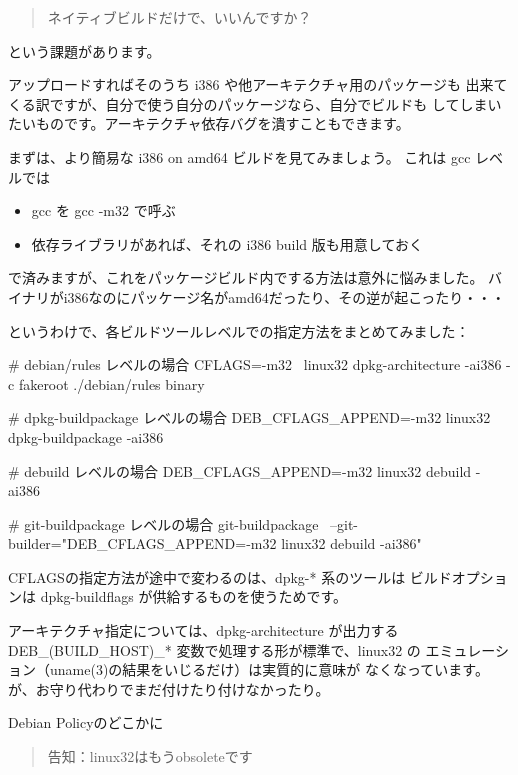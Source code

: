 \documentclass[mingoth,a4paper]{jsarticle}
\begin{document}
\begin{quote}
\Large{ネイティブビルドだけで、いいんですか？}
\end{quote}

という課題があります。

アップロードすればそのうち i386 や他アーキテクチャ用のパッケージも
出来てくる訳ですが、自分で使う自分のパッケージなら、自分でビルドも
してしまいたいものです。アーキテクチャ依存バグを潰すこともできます。

まずは、より簡易な i386 on amd64 ビルドを見てみましょう。
これは gcc レベルでは

\begin{itemize}
\item gcc を gcc -m32 で呼ぶ
\item 依存ライブラリがあれば、それの i386 build 版も用意しておく
\end{itemize}

で済みますが、これをパッケージビルド内でする方法は意外に悩みました。
バイナリがi386なのにパッケージ名がamd64だったり、その逆が起こったり・・・

というわけで、各ビルドツールレベルでの指定方法をまとめてみました：

\begin{commandline}
# debian/rules レベルの場合
CFLAGS=-m32 \
linux32 dpkg-architecture -ai386 -c fakeroot ./debian/rules binary

# dpkg-buildpackage レベルの場合
DEB_CFLAGS_APPEND=-m32 linux32 dpkg-buildpackage -ai386

# debuild レベルの場合
DEB_CFLAGS_APPEND=-m32 linux32 debuild -ai386

# git-buildpackage レベルの場合
git-buildpackage \
--git-builder="DEB_CFLAGS_APPEND=-m32 linux32 debuild -ai386"
\end{commandline}

CFLAGSの指定方法が途中で変わるのは、dpkg-* 系のツールは
ビルドオプションは dpkg-buildflags が供給するものを使うためです。

アーキテクチャ指定については、dpkg-architecture が出力する
DEB\_(BUILD\_HOST)\_* 変数で処理する形が標準で、linux32 の
エミュレーション（uname(3)の結果をいじるだけ）は実質的に意味が
なくなっています。が、お守り代わりでまだ付けたり付けなかったり。

Debian Policyのどこかに

\begin{quote}
\Large{告知：linux32はもうobsoleteです}
\end{quote}
\end{document}
